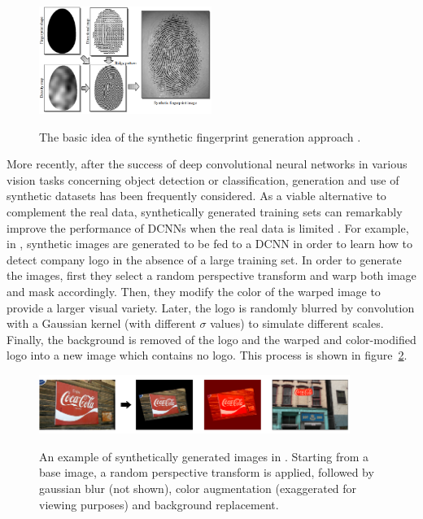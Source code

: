 \begin{figure}[H]
	\centering
	{\includegraphics[width=0.5\textwidth]{images/finger}}
	\caption{The basic idea of the synthetic fingerprint generation approach \cite{cappelli2000synthetic}.}
	\label{finger}
\end{figure}


More recently, after the success of deep convolutional neural networks in various vision tasks concerning object detection or classification, generation and use of synthetic datasets has been frequently considered. As a viable alternative to complement the real data, synthetically generated training sets can remarkably improve the performance of DCNNs when the real data is limited \cite{eggert2015benefit,hu2016frankenstein,jaderberg2014synthetic,gaur2015generation}. For example, in \cite{eggert2015benefit}, synthetic images are generated to be fed to a DCNN in order to learn how to detect company logo in the absence of a large training set. In order to generate the images, first they select a random perspective transform and warp both image and mask accordingly. Then, they modify the color of the warped image to provide a larger visual variety. Later, the logo is randomly blurred by convolution with a Gaussian kernel (with different $\sigma$ values) to simulate different scales. Finally, the background is removed of the logo and the warped and color-modified logo into a new image which contains no logo. This process is shown in figure~\ref{cocacola}.

\begin{figure}[H]
	\centering
	{\includegraphics[width=0.9\textwidth]{images/cocacola}}
	\caption{An example of synthetically generated images in \cite{eggert2015benefit}. Starting from a base image, a random perspective transform is applied,  followed by gaussian blur (not shown),  color augmentation (exaggerated for viewing purposes) and background replacement.}
	\label{cocacola}
\end{figure}

